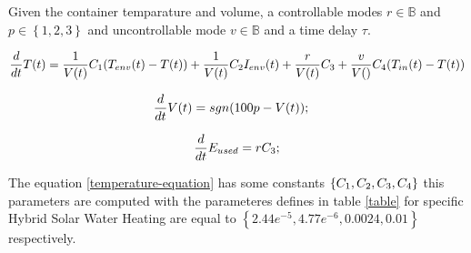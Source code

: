 \documentclass[a4paper,12pt]{book}
\begin{document}
    Given the container temparature and volume, a controllable modes $r \in \mathbb{B}$
    and $p \in \left\lbrace1,2,3\right\rbrace $ and uncontrollable mode
    $v \in \mathbb{B} $ and a time delay $\tau$.


    
    \begin{equation}
    \frac{d}{dt}T(t) =   \frac{1}{V(t)}  C_1(T_{env}(t)-T(t))+ \frac{1}{V(t)} C_{2}I_{env}(t)+  \frac{r}{V(t)} C_{3} +  \frac{v}{V()} C_{4}(T_{in}(t)-T(t))
    \label{temperature-equation}
    \end{equation}

    \begin{equation}
    \frac{d}{dt}V(t) = sgn(100p - V(t)); \quad
    \label{volume-equation}
    \end{equation}

    \begin{equation} 
    \frac{d}{dt}E_{used} =  r C_{3} ;
    \label{Energy-equation}
    \end{equation}

    The equation \ref{temperature-equation} has some constants $\left\lbrace 
    C_1, C_{2}, C_{3}, C_{4} \right\rbrace $ this
    parameters are computed with the parameteres defines in table \ref{table} for specific Hybrid Solar Water Heating
    are equal to $\left\lbrace 2.44e^{-5},  4.77e^{-6}
    , 0.0024, 0.01  \right\rbrace$ respectively.





    



    
\end{document}
